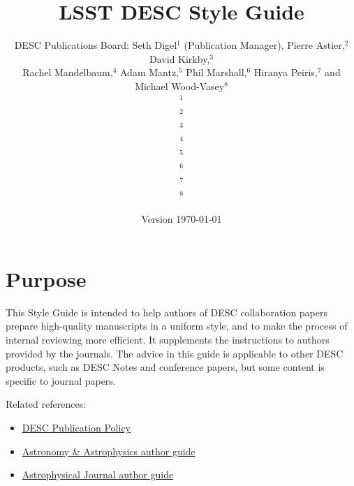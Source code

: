 \documentclass[letterpaper,11pt]{article}
\newcommand*{\version}{Version \today}
\begin{document}

\title{\vspace{5cm}LSST DESC Style Guide}
\author{DESC Publications Board: Seth Digel$^1$ (Publication Manager), Pierre Astier,$^2$ David Kirkby,$^3$\\ Rachel Mandelbaum,$^4$ Adam Mantz,$^5$ Phil Marshall,$^6$ Hiranya Peiris,$^7$ and Michael Wood-Vasey$^8$
  \medskip\\
    {\small$^1$}\\
    {\small$^2$}\\
    {\small$^3$}\\
    {\small$^4$}\\
    {\small$^5$\suphysics}\\
    {\small$^6$}\\
    {\small$^7$}\\
    {\small$^8$}
}
\date{\version}
\maketitle
\thispagestyle{fancy}

\clearpage
\fancyhead{}
\fancyhead[L]{\version}
\fancyhead[R]{\thepage}
\setcounter{page}{1}

\tableofcontents

\clearpage
\fancyhead[C]{\rightmark}
\setcounter{page}{1}

\section{Purpose}

This Style Guide is intended to help authors of DESC collaboration papers prepare
high-quality manuscripts in a uniform style, and to make the process of internal reviewing more efficient. It supplements the instructions
to authors provided by the journals.  The advice in this guide is applicable to other DESC products, such as DESC Notes and conference papers, but some content is specific to journal papers.

Related references:
\begin{itemize}
\item{\href{http://lsst-desc.org/sites/default/files/LSST_DESC_Publication_Policy_v6_15aug2016.pdf}{DESC Publication Policy}}

\item{\href{https://www.aanda.org/doc_journal/instructions/aadoc.pdf}{Astronomy \& Astrophysics author guide}}

\item{\href{http://journals.aas.org/authors/manuscript.html}{Astrophysical Journal author guide}}

\end{itemize}
\end{document}
